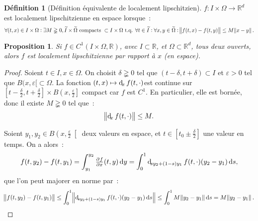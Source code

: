\documentclass{report}
\newtheorem{prp}[thm]{Proposition}
\theoremstyle{definition}
\newtheorem{déf}[thm]{Définition}
\theoremstyle{remark}
\numberwithin{equation}{section}
\newcommand{\R}{\mathbb R}
\newcommand{\tq}{\text{ t.q. }}
\begin{document}
			\begin{déf}[Définition équivalente de localement lipschitzien] $f : I \times \Omega \to \R^d$ est localement lipschitzienne en espace lorsque~:
			\begin{equation}
				\forall (t, x) \in I \times \Omega : \exists M \gneqq 0, \widetilde I \times \widetilde \Omega \text{ compacts } \subset I \times \Omega \tq
				\forall t \in \widetilde I : \forall x, y \in \widetilde \Omega : \norm {f(t, x) - f(t, y)} \leq M\norm {x-y}.
			\end{equation}
			\end{déf}

			\begin{prp}\label{prp:C1=>loclipschitz} Si $f \in C^1(I \times \Omega, \R)$, avec $I \subset \R$, et $\Omega \subset \R^d$, tous deux ouverts,
			alors $f$ est localement lipschitzienne par rapport à $x$ (en espace).
			\end{prp}

			\begin{proof} Soient $t \in I, x \in \Omega$. On choisit $\delta \gneqq 0$ tel que $(t-\delta, t+\delta) \subset I$ et $\varepsilon > 0$ tel que
			$B(x, \varepsilon[ \subset \Omega$. La fonction $(t, x) \mapsto \dif_xf(t, \cdot)$\footnotemark est continue sur
			$\left[t-\frac \delta2, t+\frac \delta2\right] \times B\left(x, \frac \varepsilon2\right]$ compact car $f$ est $C^1$. En particulier, elle est bornée,
			donc il existe $M \gneqq 0$ tel que~:
			\begin{equation}
				\norm {\dif_xf(t, \cdot)} \leq M.
			\end{equation}

			Soient $y_1, y_2 \in B\left(x, \frac \varepsilon2\right[$ deux valeurs en espace, et $t \in \left[t_0 \pm \frac \delta2\right]$ une valeur en temps.
			On a alors~:
			\begin{equation}
				f(t, y_2) - f(t, y_1) = \int_{y_1}^{y_2}\pd fx(t, y)\dif y = \int_0^1\dif_{sy_2 + (1-s)y_1}f(t, \cdot)(y_2-y_1)\dif s,
			\end{equation}
			que l'on peut majorer en norme par~:
			\begin{equation}
				\norm {f(t, y_2) - f(t, y_1)} \leq \int_0^1\norm {\dif_{sy_2 + (1-s)y_1}f(t, \cdot)(y_2-y_1)\dif s} \leq \int_0^1M\norm {y_2-y_1}\dif s
				= M\norm {y_2-y_1}.
			\end{equation}
			\end{proof}		
\end{document}
